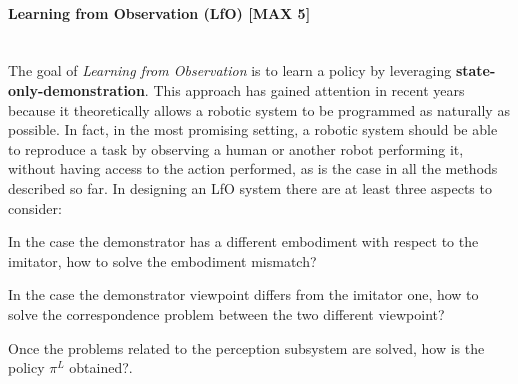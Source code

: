 \newpage
\paragraph{Learning from Observation (LfO) [MAX 5]} \mbox{} \\
\label{sec:lfo}
The goal of \textit{Learning from Observation} is to learn a policy by leveraging \textbf{state-only-demonstration}. This approach has gained attention in recent years because it theoretically allows a robotic system to be programmed as naturally as possible. In fact, in the most promising setting, a robotic system should be able to reproduce a task by observing a human or another robot performing it, without having access to the action performed, as is the case in all the methods described so far. In designing an LfO system there are at least three aspects to consider: \begin{enumerate*}[label=\textbf{(\arabic*)}]
    \item In the case the demonstrator has a different embodiment with respect to the imitator, how to solve the embodiment mismatch?
    \item In the case the demonstrator viewpoint differs from the imitator one, how to solve the correspondence problem between the two different viewpoint?
    \item Once the problems related to the perception subsystem are solved, how is the policy $\pi^{L}$ obtained?. 
\end{enumerate*}



